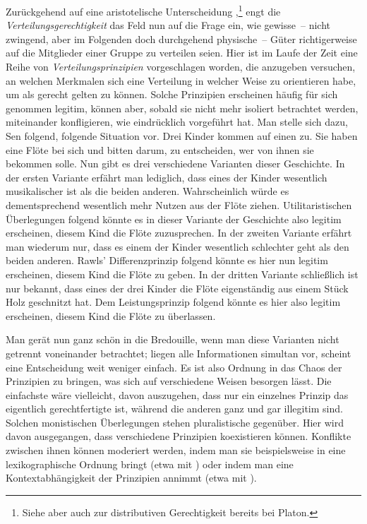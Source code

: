 \documentclass[justified,nobib,nohyper,symmetric,twoside]{tufte-book}
\begin{document}
Zurückgehend auf eine aristotelische Unterscheidung \citep[Buch 5]{aristoteles_nikomachische_2006},\footnote{Siehe aber auch \citet{knoll_distributive_2010} zur distributiven Gerechtigkeit bereits bei Platon.} engt die \textit{Verteilungsgerechtigkeit} das Feld nun auf die Frage ein, wie gewisse~-- nicht zwingend, aber im Folgenden doch durchgehend physische~-- Güter richtigerweise auf die Mitglieder einer Gruppe zu verteilen seien.
Hier ist im Laufe der Zeit eine Reihe von \textit{Verteilungsprinzipien} vorgeschlagen worden, die anzugeben versuchen, an welchen Merkmalen sich eine Verteilung in welcher Weise zu orientieren habe, um als gerecht gelten zu können.
Solche Prinzipien erscheinen häufig für sich genommen legitim, können aber, sobald sie nicht mehr isoliert betrachtet werden, miteinander konfligieren, wie \citet[S.~290f.]{sen_resources_1984} eindrücklich vorgeführt hat.
Man stelle sich dazu, Sen folgend, folgende Situation vor.
Drei Kinder kommen auf einen zu.
Sie haben eine Flöte bei sich und bitten darum, zu entscheiden, wer von ihnen sie bekommen solle.
Nun gibt es drei verschiedene Varianten dieser Geschichte.
In der ersten Variante erfährt man lediglich, dass eines der Kinder wesentlich musikalischer ist als die beiden anderen.
Wahrscheinlich würde es dementsprechend wesentlich mehr Nutzen aus der Flöte ziehen.
Utilitaristischen Überlegungen folgend könnte es in dieser Variante der Geschichte also legitim erscheinen, diesem Kind die Flöte zuzusprechen.
In der zweiten Variante erfährt man wiederum nur, dass es einem der Kinder wesentlich schlechter geht als den beiden anderen.
Rawls' Differenzprinzip folgend könnte es hier nun legitim erscheinen, diesem Kind die Flöte zu geben.
In der dritten Variante schließlich ist nur bekannt, dass eines der drei Kinder die Flöte eigenständig aus einem Stück Holz geschnitzt hat.
Dem Leistungsprinzip folgend könnte es hier also legitim erscheinen, diesem Kind die Flöte zu überlassen.

Man gerät nun ganz schön in die Bredouille, wenn man diese Varianten nicht getrennt voneinander betrachtet; liegen alle Informationen simultan vor, scheint eine Entscheidung weit weniger einfach.
Es ist also Ordnung in das Chaos der Prinzipien zu bringen, was sich auf verschiedene Weisen besorgen lässt.
Die einfachste wäre vielleicht, davon auszugehen, dass nur ein einzelnes Prinzip das eigentlich gerechtfertigte ist, während die anderen ganz und gar illegitim sind.
Solchen monistischen Überlegungen stehen pluralistische gegenüber.
Hier wird davon ausgegangen, dass verschiedene Prinzipien koexistieren können.
Konflikte zwischen ihnen können moderiert werden, indem man sie beispielsweise in eine lexikographische Ordnung bringt (etwa mit \cite{rawls_theory_1971}) oder indem man eine Kontextabhängigkeit der Prinzipien annimmt (etwa mit \cite{walzer_spheres_1983}).
\end{document}
